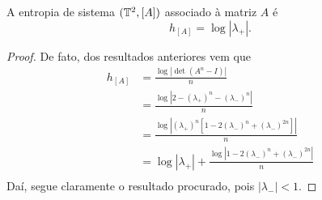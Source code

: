 \begin{theorem}
A entropia de sistema $(\mathbb{T}^2, [A])$ associado à matriz $A$ é
	\begin{equation*}
	h_{[A]} = \log|\lambda_+|.
	\end{equation*}
\end{theorem}
\begin{proof}
De fato, dos resultados anteriores vem que
	\begin{align*}
	h_{[A]} &= \frac{\log|\det(A^n - I)|}{n}\\
		&= \frac{\log|2 - (\lambda_+)^n - (\lambda_-)^n|}{n}\\
		&= \frac{\log|(\lambda_+)^n[1 - 2(\lambda_-)^n + (\lambda_-)^{2n}]|}{n}\\
		&= \log|\lambda_+| + \frac{\log|1 - 2(\lambda_-)^n + (\lambda_-)^{2n}|}{n}\\
	\end{align*}
Daí, segue claramente o resultado procurado, pois $|\lambda_-| < 1$.
\end{proof}




